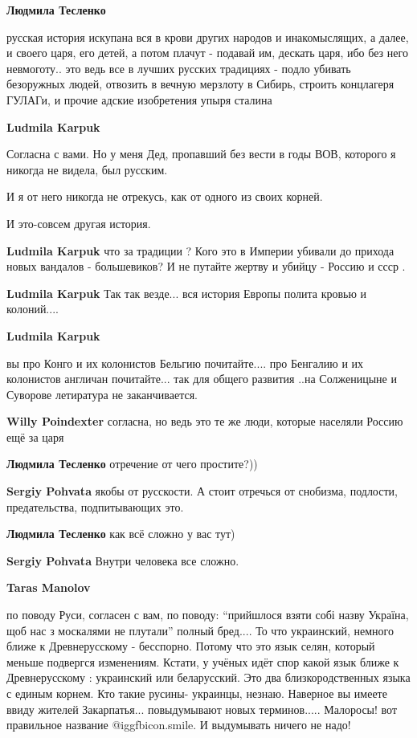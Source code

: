 \begin{itemize}
\begin{itemize}
\textbf{Людмила Тесленко} 

русская история искупана вся в крови других народов и инакомыслящих, а далее, и
своего царя, его детей, а потом плачут - подавай им, дескать царя, ибо без него
невмоготу.. это ведь все в лучших русских традициях - подло убивать безоружных
людей, отвозить в вечную мерзлоту в Сибирь, строить концлагеря ГУЛАГи, и прочие
адские изобретения упыря сталина

\begin{itemize} %
\textbf{Ludmila Karpuk} 

Согласна с вами. Но у меня Дед, пропавший без вести в годы ВОВ, которого я никогда
не видела, был русским.

И я от него никогда не отрекусь, как от одного из своих корней.

И это-совсем другая история.


\textbf{Ludmila Karpuk} что за традиции ? Кого это в Империи убивали до прихода новых вандалов - большевиков? И не путайте жертву и убийцу - Россию и ссср .

\textbf{Ludmila Karpuk} Так так везде... вся история Европы полита кровью и колоний....

\textbf{Ludmila Karpuk} 

вы про Конго и их колонистов Бельгию почитайте.... про Бенгалию и их колонистов
англичан почитайте... так для общего развития ..на Солженицыне и Суворове
летиратура не заканчивается.


\textbf{Willy Poindexter} согласна, но ведь это те же люди, которые населяли Россию ещё за царя
\end{itemize} %

\textbf{Людмила Тесленко} отречение от чего простите?))

\begin{itemize} %
\textbf{Sergiy Pohvata} якобы от русскости.
А стоит отречься от снобизма, подлости, предательства, подпитывающих это.

\textbf{Людмила Тесленко} как всё сложно у вас тут)

\textbf{Sergiy Pohvata} Внутри человека все сложно.
\end{itemize} %

\textbf{Taras Manolov} 

по поводу Руси, согласен с вам, по поводу: \enquote{прийшлося взяти собі назву Україна,
щоб нас з москалями не плутали} полный бред.... То что украинский, немного
ближе к Древнерусскому - бесспорно. Потому что это язык селян, который меньше
подвергся изменениям. Кстати, у учёных идёт спор какой язык ближе к
Древнерусскому : украинский или беларусский. Это два близкородственных языка с
единым корнем. Кто такие русины- украинцы, незнаю. Наверное вы имеете ввиду
жителей Закарпатья... повыдумывают новых терминов..... Малоросы! вот правильное
название  @igg{fbicon.smile}. И выдумывать ничего не надо!


\end{itemize}
\end{itemize}
